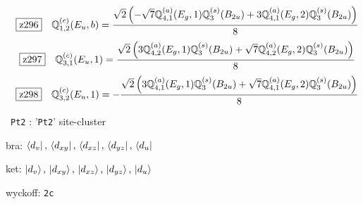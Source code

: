 \documentclass[fleqn,10pt,landscape]{jsarticle}
\begin{document}
\begin{dmath*}
\hspace*{3mm}\fbox{z296}\quad \mathbb{Q}_{1,2}^{(c)}(E_{u},b)=\frac{\sqrt{2} \left(- \sqrt{7} \mathbb{Q}_{4,1}^{(a)}(E_{g},1) \mathbb{Q}_{3}^{(s)}(B_{2u}) + 3 \mathbb{Q}_{4,1}^{(a)}(E_{g},2) \mathbb{Q}_{3}^{(s)}(B_{2u})\right)}{8}
\end{dmath*}
\begin{dmath*}
\hspace*{3mm}\fbox{z297}\quad \mathbb{Q}_{3,1}^{(c)}(E_{u},1)=\frac{\sqrt{2} \left(3 \mathbb{Q}_{4,2}^{(a)}(E_{g},1) \mathbb{Q}_{3}^{(s)}(B_{2u}) + \sqrt{7} \mathbb{Q}_{4,2}^{(a)}(E_{g},2) \mathbb{Q}_{3}^{(s)}(B_{2u})\right)}{8}
\end{dmath*}
\begin{dmath*}
\hspace*{3mm}\fbox{z298}\quad \mathbb{Q}_{3,2}^{(c)}(E_{u},1)=- \frac{\sqrt{2} \left(3 \mathbb{Q}_{4,1}^{(a)}(E_{g},1) \mathbb{Q}_{3}^{(s)}(B_{2u}) + \sqrt{7} \mathbb{Q}_{4,1}^{(a)}(E_{g},2) \mathbb{Q}_{3}^{(s)}(B_{2u})\right)}{8}
\end{dmath*}
\vspace{5mm}

\noindent\textbullet\, \texttt{Pt2} : '\texttt{Pt2}' site-cluster

\noindent\quad * bra: $\bra{d_{v}},\, \bra{d_{xy}},\, \bra{d_{xz}},\, \bra{d_{yz}},\, \bra{d_{u}}$

\noindent\quad * ket: $\ket{d_{v}},\, \ket{d_{xy}},\, \ket{d_{xz}},\, \ket{d_{yz}},\, \ket{d_{u}}$

\noindent\quad * wyckoff: \texttt{2c}
\end{document}
